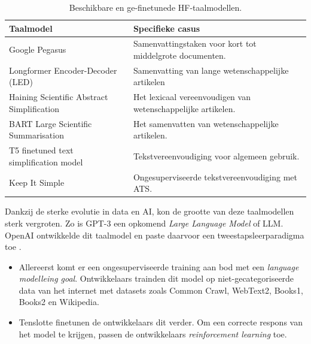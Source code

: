 \begin{center}
	\begin{table}[H]
	\begin{tabular}{ | m{4cm} | m{12cm} | } 
		\hline
		\textbf{Taalmodel} & \textbf{Specifieke casus} \\ \hline
		Google Pegasus & Samenvattingstaken voor kort tot middelgrote documenten. \\
		\hline
		Longformer Encoder-Decoder (LED) & Samenvatting van lange wetenschappelijke artikelen \\
		\hline
		Haining Scientific Abstract Simplification & Het lexicaal vereenvoudigen van wetenschappelijke artikelen. \\
		\hline
		BART Large Scientific Summarisation & Het samenvatten van wetenschappelijke artikelen. \\
		\hline
		T5 finetuned text simplification model & Tekstvereenvoudiging voor algemeen gebruik. \\
		\hline
		Keep It Simple & Ongesuperviseerde tekstvereenvoudiging met ATS. \\
		\hline
	\end{tabular}
		\caption{Beschikbare en ge-finetunede HF-taalmodellen.}
		\label{table:huggingface-models}
	\end{table}
\end{center}

Dankzij de sterke evolutie in data en AI, kon de grootte van deze taalmodellen sterk vergroten. Zo is GPT-3 een opkomend \textit{Large Language Model} of LLM. OpenAI ontwikkelde dit taalmodel en paste daarvoor een tweestapsleerparadigma toe \autocite{Radford2019, Li2022}. 

\begin{itemize}
	\item Allereerst komt er een ongesuperviseerde training aan bod met een \textit{language modelleing goal}. Ontwikkelaars trainden dit model op niet-gecategoriseerde data van het internet met datasets zoals Common Crawl, WebText2, Books1, Books2 en Wikipedia.
	\item Tenslotte finetunen de ontwikkelaars dit verder. Om een correcte respons van het model te krijgen, passen de ontwikkelaars \textit{reinforcement learning} toe.
\end{itemize}

